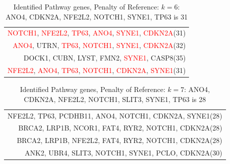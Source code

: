 \documentclass[xcolor=dvipsnames]{beamer}
\begin{document}
\begin{frame}
\begin{table}
\begin{tabular}{r}
\hline
\textcolor{red}{NOTCH1}, \textcolor{red}{NFE2L2}, \textcolor{red}{TP63}, \textcolor{red}{ANO4}, \textcolor{red}{SYNE1}, \textcolor{red}{CDKN2A}(31)\\
\textcolor{red}{ANO4}, UTRN, \textcolor{red}{TP63}, \textcolor{red}{NOTCH1}, \textcolor{red}{SYNE1}, \textcolor{red}{CDKN2A}(32)\\
DOCK1, CUBN, LYST, FMN2, \textcolor{red}{SYNE1}, CASP8(35)\\
\textcolor{red}{NFE2L2}, \textcolor{red}{ANO4}, \textcolor{red}{TP63}, \textcolor{red}{NOTCH1}, \textcolor{red}{CDKN2A}, \textcolor{red}{SYNE1}(31)\\
\hline
\end{tabular}
\caption{Identified Pathway genes, Penalty of Reference: $k=6$: ANO4, CDKN2A, NFE2L2, NOTCH1, SYNE1, TP63 is 31}
\end{table}
\end{frame}
\begin{frame}
\begin{table}
\begin{tabular}{r}
\hline
NFE2L2, TP63, PCDHB11, ANO4, NOTCH1, CDKN2A, SYNE1(28)\\
BRCA2, LRP1B, NCOR1, FAT4, RYR2, NOTCH1, CDKN2A(28)\\
BRCA2, LRP1B, NFE2L2, FAT4, RYR2, NOTCH1, CDKN2A(28)\\
ANK2, UBR4, SLIT3, NOTCH1, SYNE1, PCLO, CDKN2A(30)\\
\hline
\end{tabular}
\caption{Identified Pathway genes, Penalty of Reference: $k=7$: ANO4, CDKN2A, NFE2L2, NOTCH1, SLIT3, SYNE1, TP63 is 28}
\end{table}
\end{frame}
\end{document}
